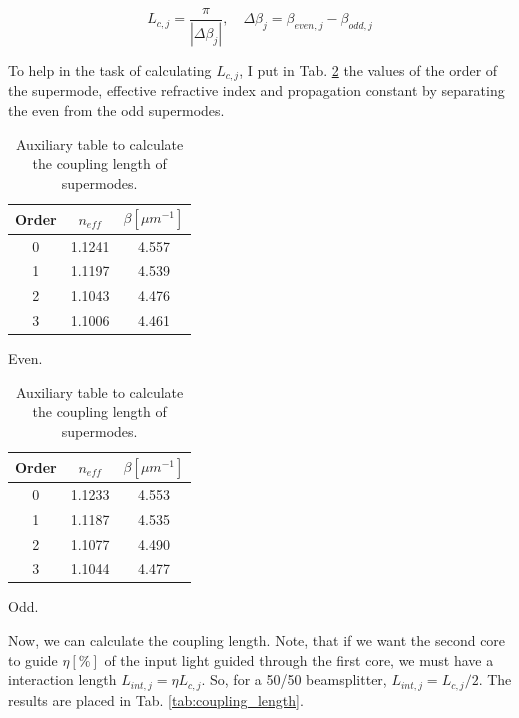 \documentclass[a4paper,12pt]{article}
\begin{document}
\begin{equation}
    L_{c,j} = \frac{\pi}{|\Delta \beta_j|}, \quad \Delta \beta_j = \beta_{even, j} - \beta_{odd, j} 
    \label{eq:coupling_length}
\end{equation}

To help in the task of calculating $L_{c,j}$, I put in Tab. \ref{tab:coupling_length_aux} the values of the order of the supermode, effective refractive index and propagation constant by separating the even from the odd supermodes.

\begin{table}[H]
    \centering
    \begin{subtable}{0.45\textwidth}
        \centering
        \begin{tabular}{ccc}
            \toprule
            Order & $n_{eff}$ & $\beta [\mu m^{-1}]$ \\
            \midrule
            0 & 1.1241 & 4.557 \\
            1 & 1.1197 & 4.539 \\
            2 & 1.1043 & 4.476 \\
            3 & 1.1006 & 4.461 \\
            \bottomrule
        \end{tabular}
        \caption{Even.}
    \end{subtable}
    \hfill
    \begin{subtable}{0.45\textwidth}
        \centering
        \begin{tabular}{ccc}
            \toprule
            Order & $n_{eff}$ & $\beta [\mu m^{-1}]$ \\
            \midrule
            0 & 1.1233 & 4.553 \\
            1 & 1.1187 & 4.535 \\
            2 & 1.1077 & 4.490 \\
            3 & 1.1044 & 4.477 \\
            \bottomrule
        \end{tabular}
        \caption{Odd.}
    \end{subtable}
    \caption{Auxiliary table to calculate the coupling length of supermodes.}
    \label{tab:coupling_length_aux}
\end{table}

Now, we can calculate the coupling length. Note, that if we want the second core to guide $\eta [\%]$ of the input light guided through the first core, we must have a interaction length $L_{int, j} = \eta L_{c, j}$. So, for a 50/50 beamsplitter, $L_{int, j} = L_{c,j} / 2$. The results are placed in Tab. \ref{tab:coupling_length}.
\end{document}
